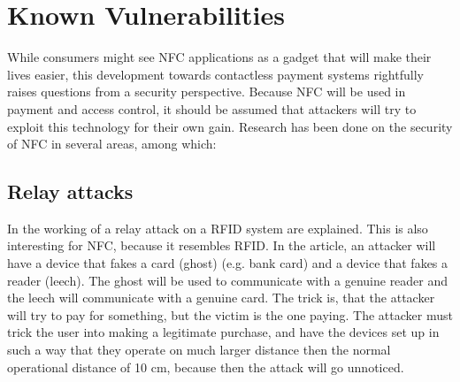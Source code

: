 \section{Known Vulnerabilities}

While consumers might see NFC applications as a gadget that will make their lives easier, this development towards contactless payment systems rightfully raises questions from a security perspective.
Because NFC will be used in payment and access control, it should be assumed that attackers will try to exploit this technology for their own gain. 
Research has been done on the security of NFC in several areas, among which:


\subsection{Relay attacks}

In \cite{1128470} the working of a relay attack on  a RFID system are explained.
This is also interesting for NFC, because it resembles RFID.
In the article, an attacker will have a device that fakes a card (ghost) (e.g. bank card) and a device that fakes a reader (leech). 
The ghost will be used to communicate with a genuine reader and the leech will communicate with a genuine card.
The trick is, that the attacker will try to pay for something, but the victim is the one paying.
The attacker must trick the user into making a legitimate purchase, and have the devices set up in such a way that they operate on much larger distance then the normal operational distance of 10 cm, because then the attack will go unnoticed.

